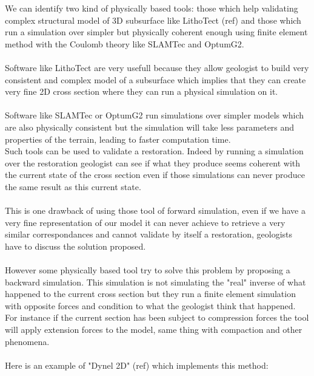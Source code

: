 \documentclass[12pt, a4paper]{memoir} %
\begin{document}
 We can identify two kind of physically based tools: those which help validating complex structural model of 3D subsurface like LithoTect (ref) and those which run a simulation over simpler but physically coherent enough using finite element method with the Coulomb theory like SLAMTec and OptumG2.\\\\
 
Software like LithoTect are very usefull because they allow geologist to build very consistent and complex model of a subsurface which implies that they can create very fine 2D cross section where they can run a physical simulation on it.\\\\

Software like SLAMTec or OptumG2 run simulations over simpler models which are also physically consistent but the simulation will take less parameters and properties of the terrain, leading to faster computation time.\\
Such tools can be used to validate a restoration. Indeed by running a simulation over the restoration geologist can see if what they produce seems coherent with the current state of the cross section even if those simulations can never produce the same result as this current state.\\\\
 This is one drawback of using those tool of forward simulation, even if we have a very fine representation of our model it can never achieve to retrieve a very similar correspondances and cannot validate by itself a restoration, geologists have to discuss the solution proposed.\\\\ 
 However some physically based tool try to  solve this problem by proposing a backward simulation. This simulation is not simulating the "real" inverse of what happened to the current cross section but they run a finite element simulation with opposite forces and condition to what the geologist think that happened. For instance if the current section has been subject to compression forces the tool will apply extension forces to the model, same thing with compaction and other phenomena.\\\\
 Here is an example of "Dynel 2D" (ref) which implements this method:
\end{document}
